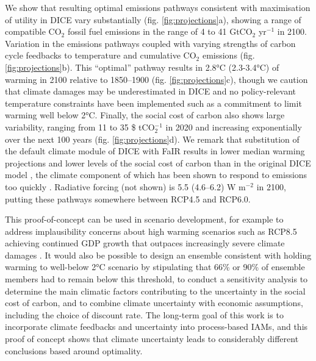 \documentclass{article}
\begin{document}
We show that resulting optimal emissions pathways consistent with maximisation of utility in DICE vary substantially (fig. \ref{fig:projections}a), showing a range of compatible CO$_2$ fossil fuel emissions in the range of 4 to 41 GtCO$_2$ yr$^{-1}$ in 2100. Variation in the emissions pathways coupled with varying strengths of carbon cycle feedbacks to temperature and cumulative CO$_2$ emissions (fig. \ref{fig:projections}b). This ``optimal'' pathway results in 2.8°C (2.3-3.4°C) of warming in 2100 relative to 1850--1900 (fig. \ref{fig:projections}c), though we caution that climate damages may be underestimated in DICE \citep{Dietz2015} and no policy-relevant temperature constraints have been implemented such as a commitment to limit warming well below 2°C. Finally, the social cost of carbon also shows large variability, ranging from 11 to 35 \$ tCO$_2^{-1}$ in 2020 and increasing exponentially over the next 100 years (fig. \ref{fig:projections}d). We remark that substitution of the default climate module of DICE with FaIR results in lower median warming projections and lower levels of the social cost of carbon than in the original DICE model \citep{Nordhaus2017}, the climate component of which has been shown to respond to emissions too quickly \citep{Folini2021,Gasser2021}. Radiative forcing (not shown) is 5.5 (4.6--6.2) W m$^{-2}$ in 2100, putting these pathways somewhere between RCP4.5 and RCP6.0.

This proof-of-concept can be used in scenario development, for example to address implausibility concerns about high warming scenarios such as RCP8.5 achieving continued GDP growth that outpaces increasingly severe climate damages \citep{Woodard2019}. It would also be possible to design an ensemble consistent with holding warming to well-below 2°C scenario by stipulating that 66\% or 90\% of ensemble members had to remain below this threshold, to conduct a sensitivity analysis to determine the main climatic factors contributing to the uncertainty in the social cost of carbon, and to combine climate uncertainty with economic assumptions, including the choice of discount rate. The long-term goal of this work is to incorporate climate feedbacks and uncertainty into process-based IAMs, and this proof of concept shows that climate uncertainty leads to considerably different conclusions based around optimality.


\end{document}
